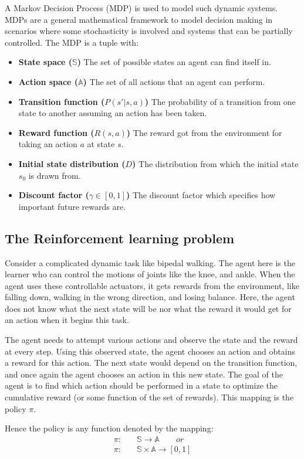 \documentclass[hidelinks,BTech]{iitmdiss}
\begin{document}
A Markov Decision Process \cite{MarkovDecisionProcess} (MDP) is used to model such dynamic systems. MDPs are a general mathematical framework to model decision making in scenarios where some stochasticity is involved and systems that can be partially controlled. The MDP is a tuple with:
\begin{itemize}
\item{{\bf State space ($\mathbb{S}$)} The set of possible states an agent can find itself in.}
\item{{\bf Action space ($\mathbb{A}$)} The set of all actions that an agent can perform.}
\item{{\bf Transition function ($P(s'|s,a)$)} The probability of a transition from one state to another assuming an action has been taken.}
\item{{\bf Reward function ($R(s, a)$)} The reward got from the environment for taking an action $a$ at state $s$.}
\item{{\bf Initial state distribution ($D$)} The distribution from which the initial state $s_0$ is drawn from.}
\item{{\bf Discount factor ($\gamma \in [0,1]$)} The discount factor which specifies how important future rewards are.}
\end{itemize}

\subsection{The Reinforcement learning problem}
Consider a complicated dynamic task like bipedal walking. The agent here is the learner who can control the motions of joints like the knee, and ankle. When the agent uses these controllable actuators, it gets rewards from the environment, like falling down, walking in the wrong direction, and losing balance. Here, the agent does not know what the next state will be nor what the reward it would get for an action when it begins this task.

The agent needs to attempt various actions and observe the state and the reward at every step. Using this observed state, the agent chooses an action and obtains a reward for this action. The next state would depend on the transition function, and once again the agent chooses an action in this new state. The goal of the agent is to find which action should be performed in a state to optimize the cumulative reward (or some function of the set of rewards). This mapping is the policy $\pi$.

Hence the policy is any function denoted by the mapping:
\begin{equation} \begin{split}
  \pi :& \quad \mathbb{S} \rightarrow \mathbb{A} \qquad or \\
  \pi :& \quad \mathbb{S} \times \mathbb{A} \rightarrow [0,1]
\end{split} \end{equation}
\end{document}
